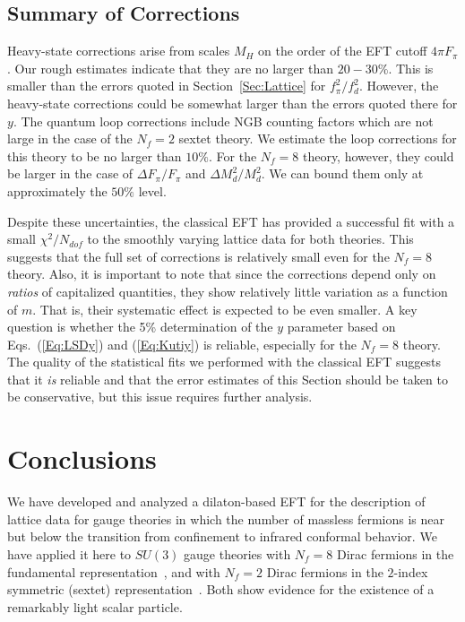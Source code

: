 \documentclass[a4paper,11pt]{article}
\begin{document}
\subsection{Summary of Corrections}

Heavy-state corrections arise from scales $M_H$ on the order of the EFT cutoff $4 \pi F_{\pi}$. Our rough estimates indicate that they are no larger than $20 - 30 \%$. This is smaller than the errors quoted in Section~\ref{Sec:Lattice} for $f_{\pi}^2/f_d^2$. However, the heavy-state corrections  could be somewhat larger than the errors quoted there for $y$. The quantum loop corrections include NGB counting factors which are not large in the case of the $N_f=2$ sextet theory. We estimate the loop corrections for this theory to be no larger than $ 10 \%$.  For the $N_f = 8$ theory, however, they could be larger in the case of $\Delta F_{\pi}/F_{\pi}$ and $\Delta M_{d}^2/M_{d}^2$. We can bound them only at approximately the $50\%$ level.
 
Despite these uncertainties, the classical EFT has provided a successful fit with a small $\chi^2/N_{dof}$ to the smoothly varying lattice data for both theories. This suggests that the  full set of corrections is relatively small even for the $N_f = 8$ theory.  Also, it is important to note that since the corrections depend only on \textit{ratios} of capitalized quantities, they show relatively little variation as a function of $m$. That is, their systematic effect is expected to be even smaller. A key question is whether the 5\% determination of the $y$ parameter based on Eqs.~(\ref{Eq:LSDy}) and (\ref{Eq:Kutiy}) is reliable, especially for the $N_f = 8$ theory. The quality of the statistical fits we performed with the classical EFT suggests that it \textit{is} reliable and that the error estimates of this Section should be taken to be conservative, but this issue requires further analysis.


\section{Conclusions}
\label{Sec:conclusions}

We have developed and analyzed a dilaton-based EFT for the description of lattice data for gauge theories in which the number of massless fermions is near but below the transition from confinement to infrared conformal behavior. We have applied it here to $SU(3)$ gauge theories with $N_f = 8$ Dirac fermions in 
the fundamental representation~\cite{LSD,LatKMI}, and with $N_f = 2$ Dirac fermions in the $2$-index symmetric (sextet) representation~\cite{FHKNSW,FHKMNW,FHKMNW2}. Both show evidence for the existence of a remarkably light scalar particle. 
\end{document}

